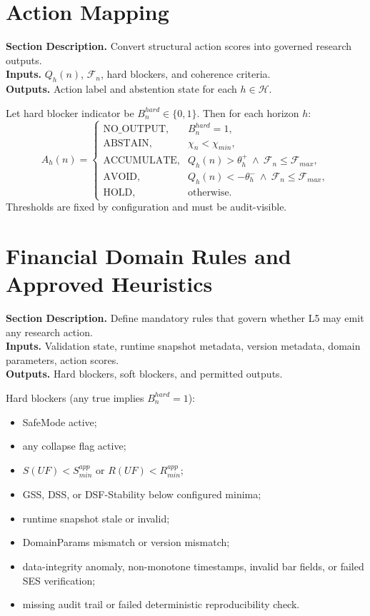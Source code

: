 \documentclass[11pt]{report}
\newcommand{\meta}[3]{\textbf{Section Description.} #1\\
\textbf{Inputs.} #2\\
\textbf{Outputs.} #3\par}
\begin{document}
\section{Action Mapping}
\meta{Convert structural action scores into governed research outputs.}{$Q_h(n)$, $\mathcal{F}_n$, hard blockers, and coherence criteria.}{Action label and abstention state for each $h\in\mathcal{H}$.}

Let hard blocker indicator be $B_n^{hard}\in\{0,1\}$. Then for each horizon $h$:
\[
A_h(n)=\begin{cases}
\text{NO\_OUTPUT}, & B_n^{hard}=1,\\
\text{ABSTAIN}, & \chi_n<\chi_{min},\\
\text{ACCUMULATE}, & Q_h(n)>\theta_h^{+}\ \wedge\ \mathcal{F}_n\le\mathcal{F}_{max},\\
\text{AVOID}, & Q_h(n)<-\theta_h^{-}\ \wedge\ \mathcal{F}_n\le\mathcal{F}_{max},\\
\text{HOLD}, & \text{otherwise.}
\end{cases}
\]
Thresholds are fixed by configuration and must be audit-visible.

\section{Financial Domain Rules and Approved Heuristics}
\meta{Define mandatory rules that govern whether L5 may emit any research action.}{Validation state, runtime snapshot metadata, version metadata, domain parameters, action scores.}{Hard blockers, soft blockers, and permitted outputs.}

Hard blockers (any true implies $B_n^{hard}=1$):
\begin{itemize}
    \item SafeMode active;
    \item any collapse flag active;
    \item $S(UF)<S_{min}^{app}$ or $R(UF)<R_{min}^{app}$;
    \item GSS, DSS, or DSF-Stability below configured minima;
    \item runtime snapshot stale or invalid;
    \item DomainParams mismatch or version mismatch;
    \item data-integrity anomaly, non-monotone timestamps, invalid bar fields, or failed SES verification;
    \item missing audit trail or failed deterministic reproducibility check.
\end{itemize}
\end{document}
